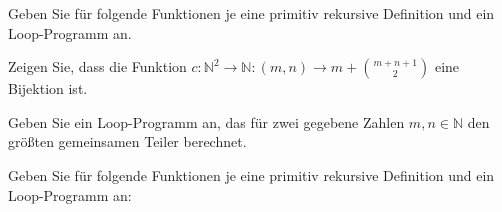 \documentclass[10pt, a4paper]{exam}
\begin{document}
\begin{questions}
    \question Geben Sie für folgende Funktionen je eine primitiv rekursive Definition und ein Loop-Programm an.

    \question Zeigen Sie, dass die Funktion $c:\mathbb{N}^2 \rightarrow\mathbb{N}: (m, n) \rightarrow m + \binom{m + n + 1}{2}$ eine Bijektion ist.
    \begin{solution}
    \end{solution}

    \question Geben Sie ein Loop-Programm an, das für zwei gegebene Zahlen $m, n \in\mathbb{N}$ den größten gemeinsamen Teiler berechnet.
    \begin{solution}
    \end{solution}

    \question Geben Sie für folgende Funktionen je eine primitiv rekursive Definition und ein Loop-Programm an:


\end{questions}
\end{document}
